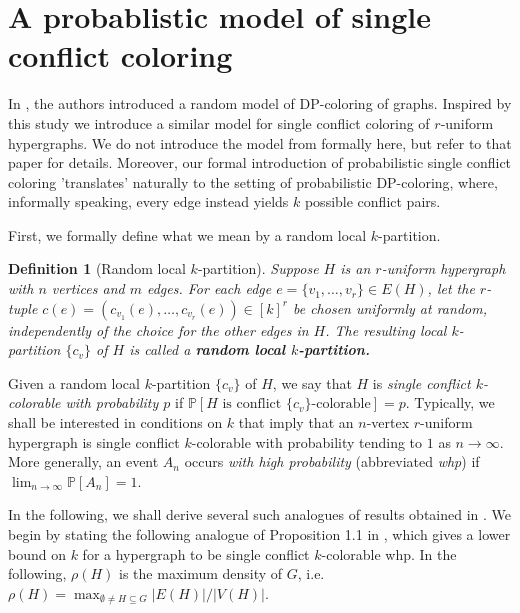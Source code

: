 \documentclass[12pt]{article}
\newtheorem{definition}[theorem]{Definition}
\newcommand{\cv}{\{c_v\}}
\renewcommand{\P}{\mathbb{P}}
\newcommand{\1}{\mathds{1}}
\begin{document}


\section{A probablistic model of single conflict coloring}
	
	In \cite{BernshteynDominikKaulMudrock}, the authors introduced
	a random model of DP-coloring of graphs. Inspired by this study we introduce a similar
	model for single conflict coloring of $r$-uniform hypergraphs. 
	We do not introduce the model from 
	\cite{BernshteynDominikKaulMudrock} formally here, but refer
	to that paper for details. Moreover, our formal introduction
	of probabilistic single conflict coloring 'translates' naturally to the setting of probabilistic DP-coloring,
	where, informally speaking, every edge instead yields $k$ possible conflict pairs.

First, we formally define what we mean by a random local $k$-partition.

\begin{definition}[Random local $k$-partition]
    Suppose $H$ is an $r$-uniform hypergraph with $n$ vertices and $m$ edges. For each edge 
	$e=\{v_1, \dots, v_r\}\in E(H)$, let the $r$-tuple $c(e)=(c_{v_1}(e), \dots, c_{v_r}(e))\in [k]^r$ 
	be chosen uniformly at random, 
	independently of the choice for the other edges in $H$. The resulting local 
	$k$-partition $\cv$ of $H$ is called  a \textbf{random local $k$-partition.}
\end{definition}

Given a random local $k$-partition $\{c_v\}$ of $H$, we say that $H$ is \emph{single conflict $k$-colorable with probability $p$} if $\P[H \text{ is conflict }\{c_v\}\text{-colorable}]=p$. 
%
Typically, we shall be interested in conditions on $k$ that imply that an $n$-vertex $r$-uniform hypergraph is single
conflict $k$-colorable with probability tending to $1$ as $n \to \infty$. More generally,
    an event $A_n$ occurs 
	\emph{with high probability} 
    (abbreviated {\em whp})
	if $\lim_{n \to \infty} \mathbb{P}[A_n] = 1$.

In the following, we shall derive several such analogues of results obtained in \cite{BernshteynDominikKaulMudrock}.
We begin by stating the following analogue of Proposition 1.1 in \cite{BernshteynDominikKaulMudrock},
which gives a lower bound on $k$ for a hypergraph to be single conflict $k$-colorable whp.
In the following, $\rho(H)$ is the maximum 
density of $G$, i.e.\ $\rho(H)=\max_{\emptyset \neq H\subseteq G}|E(H)|/|V(H)|$. 
\end{document}
